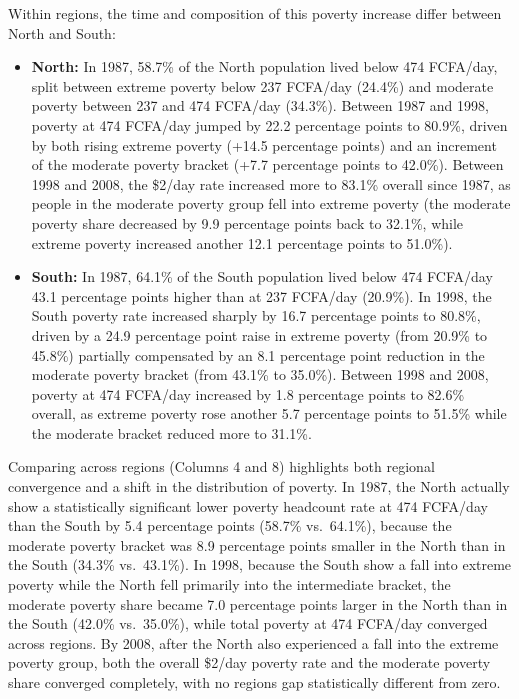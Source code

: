\documentclass[
  letterpaper,
  DIV=11,
  numbers=noendperiod]{scrartcl}
\begin{document}
Within regions, the time and composition of this poverty increase differ
between North and South:

\begin{itemize}
\item \textbf{North:} In 1987, 58.7\% of the North population lived below 474 FCFA/day, split between extreme poverty below 237 FCFA/day (24.4\%) and moderate poverty between 237 and 474 FCFA/day (34.3\%). Between 1987 and 1998, poverty at 474 FCFA/day jumped by 22.2 percentage points to 80.9\%, driven by both rising extreme poverty (+14.5 percentage points) and an increment of the moderate poverty bracket (+7.7 percentage points to 42.0\%). Between 1998 and 2008, the \$2/day rate increased more to 83.1\% overall since 1987, as people in the moderate poverty group fell into extreme poverty (the moderate poverty share decreased by 9.9 percentage points back to 32.1\%, while extreme poverty increased another 12.1 percentage points to 51.0\%).

\item \textbf{South:} In 1987, 64.1\% of the South population lived below 474 FCFA/day 43.1 percentage points higher than at 237 FCFA/day (20.9\%). In 1998, the South poverty rate increased sharply by 16.7 percentage points to 80.8\%, driven by a 24.9 percentage point raise in extreme poverty (from 20.9\% to 45.8\%) partially compensated by an 8.1 percentage point reduction in the moderate poverty bracket (from 43.1\% to 35.0\%). Between 1998 and 2008, poverty at 474 FCFA/day increased by 1.8 percentage points to 82.6\% overall, as extreme poverty rose another 5.7 percentage points to 51.5\% while the moderate bracket reduced more to 31.1\%.
\end{itemize}

Comparing across regions (Columns 4 and 8) highlights both regional
convergence and a shift in the distribution of poverty. In 1987, the
North actually show a statistically significant lower poverty headcount
rate at 474 FCFA/day than the South by 5.4 percentage points (58.7\%
vs.~64.1\%), because the moderate poverty bracket was 8.9 percentage
points smaller in the North than in the South (34.3\% vs.~43.1\%). In
1998, because the South show a fall into extreme poverty while the North
fell primarily into the intermediate bracket, the moderate poverty share
became 7.0 percentage points larger in the North than in the South
(42.0\% vs.~35.0\%), while total poverty at 474 FCFA/day converged
across regions. By 2008, after the North also experienced a fall into
the extreme poverty group, both the overall \$2/day poverty rate and the
moderate poverty share converged completely, with no regions gap
statistically different from zero.
\end{document}

